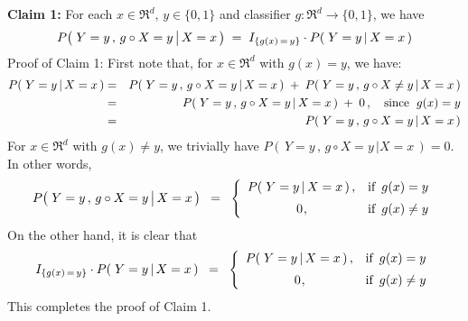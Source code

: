 \proof
\vskip 0.2cm
\noindent
\textbf{Claim 1:}\quad
For each $x \in \Re^{d}$, $y \in \{0,1\}$ and classifier $g : \Re^{d} \longrightarrow \{0,1\}$,
we have
\begin{equation*}
P\!\left(\,\left. Y = y \,,\, \overset{{\color{white}.}}{g} \circ X = y \,\right\vert X = x \,\right)
\;=\;
I_{\{g(x)\,=\,y\}} \cdot P\!\left(\,\left. Y = y \,\right\vert X = x \,\right)
\end{equation*}
Proof of Claim 1:\;
First note that, for $x \in \Re^{d}$ with $g(x) = y$, we have:
\begin{eqnarray*}
P\!\left(\,\left. Y = y \,\right\vert X = x \,\right)
& = &
	P\!\left(\,\left. Y = y\,,\, g \circ X = y \,\right\vert X = x \,\right)
	\; + \;
	P\!\left(\,\left. Y = y\,,\, g \circ X \neq y \,\right\vert X = x \,\right)
\\
& = &
	P\!\left(\,\left. Y = y\,,\, g \circ X = y \,\right\vert X = x \,\right)
	\; + \;
	0\,,
	\quad
	\textnormal{since \;$g(x) = y$}
\\
& = &
	P\!\left(\,\left. Y = y\,,\, g \circ X = y \,\right\vert X = x \,\right)
\end{eqnarray*}
For $x \in \Re^{d}$ with $g(x) \neq y$, we trivially have
$P\!\left(\,\left. Y = y\,,\, g \circ X = y \,\right\vert X = x \,\right) = 0$.
In other words,
\begin{equation*}
P\!\left(\,\left. Y = y \,,\, \overset{{\color{white}.}}{g} \circ X = y \,\right\vert X = x \,\right)
\;\; = \;\;
	\left\{\begin{array}{cl}
	P\!\left(\,\left. Y = y \,\right\vert X = x \,\right), & \textnormal{if \,$g(x) = y$}
	\\
	\overset{{\color{white}-}}{0}, & \textnormal{if \,$g(x) \neq y$}
	\end{array}\right.
\end{equation*}
On the other hand, it is clear that
\begin{equation*}
I_{\{g(x)\,=\,y\}} \cdot P\!\left(\,\left. Y = y \,\right\vert X = x \,\right)
\;\; = \;\;
	\left\{\begin{array}{cl}
	P\!\left(\,\left. Y = y \,\right\vert X = x \,\right), & \textnormal{if \,$g(x) = y$}
	\\
	\overset{{\color{white}-}}{0}, & \textnormal{if \,$g(x) \neq y$}
	\end{array}\right.
\end{equation*}
This completes the proof of Claim 1.

